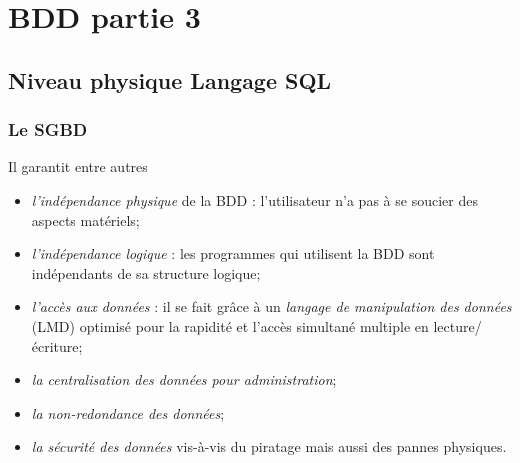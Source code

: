 \chapter{BDD partie 3}
\section{Niveau physique Langage SQL}
\subsection{Le SGBD}
Il garantit entre autres
\begin{itemize}
    \item	\textit{l'indépendance physique} de la BDD : l'utilisateur n'a pas à se soucier des aspects matériels;
    \item	\textit{l'indépendance logique} : les programmes qui utilisent la BDD sont indépendants de sa structure logique;
    \item 	\textit{l'accès aux données} : il se fait grâce à un \textit{langage de manipulation des données} (LMD) optimisé pour la rapidité et l'accès simultané multiple en lecture/écriture;
    \item 	\textit{la centralisation des données pour administration};
    \item 	\textit{la non-redondance des données};
    \item 	\textit{la sécurité des données} vis-à-vis du piratage mais aussi des pannes physiques.
\end{itemize}


